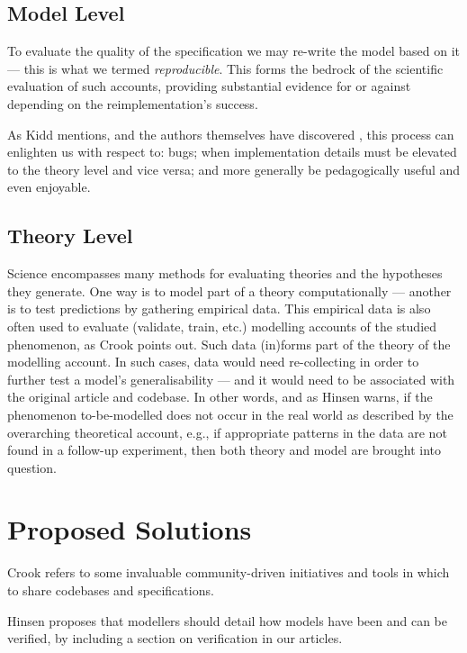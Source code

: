 \documentclass[jou]{apa6}
\begin{document}
\subsection{Model Level}
To evaluate the quality of the specification we may re-write the model based on it --- this is what we termed \textit{reproducible}.
This forms the bedrock of the scientific evaluation of such accounts, providing substantial evidence for or against depending on the reimplementation's success.

As Kidd mentions, and the authors themselves have discovered \cite{cooper14}, this process can enlighten us with respect to: bugs; when implementation details must be elevated to the theory level and vice versa; and more generally be pedagogically useful and even enjoyable.

\subsection{Theory Level}
Science encompasses many methods for evaluating theories and the hypotheses they generate.
One way is to model part of a theory computationally --- another is to test predictions by gathering empirical data.
This empirical data is also often used to evaluate (validate, train, etc.) modelling accounts of the studied phenomenon, as Crook points out. 
Such data (in)forms part of the theory of the modelling account.
In such cases, data would need re-collecting in order to further test a model's generalisability --- and it would need to be associated with the original article and codebase. 
In other words, and as Hinsen warns, if the phenomenon to-be-modelled does not occur in the real world as described by the overarching theoretical account, e.g., if appropriate patterns in the data are not found in a follow-up experiment, then both theory and model are brought into question.

\section{Proposed Solutions}

Crook refers to some invaluable community-driven initiatives and tools in which to share codebases and specifications.

Hinsen proposes that modellers should detail how models have been and can be verified, by including a section on verification in our articles.
\end{document}
